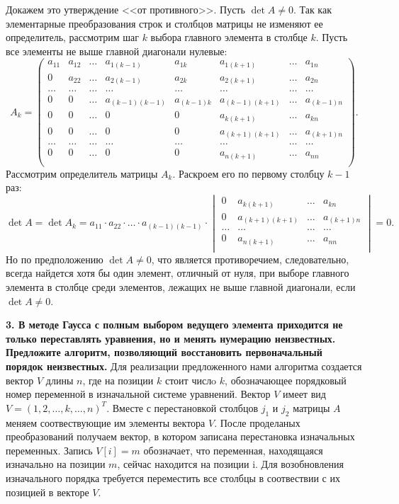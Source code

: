 \documentclass[12pt, a4paper]{article}
\begin{document}
Докажем это утверждение <<от противного>>.  Пусть $\det A \ne 0$. Так как элементарные преобразования строк и столбцов матрицы не изменяют ее определитель, рассмотрим шаг $k$ выбора главного элемента в столбце $k$. Пусть все элементы не выше главной диагонали нулевые:
\[ A_k = 
\begin{pmatrix}
	a_{11} & a_{12} & \ldots & a_{1(k-1)} & a_{1k} & a_{1(k+1)} & \ldots & a_{1n}\\
	0 & a_{22} & \ldots & a_{2(k-1)} & a_{2k} & a_{2(k+1)} & \ldots & a_{2n}\\
	\ldots & \ldots & \ldots & \ldots & \ldots & \ldots &   \ldots & \ldots \\
	0 & 0 & \ldots & a_{(k-1)(k-1)} & a_{(k-1)k} & a_{(k-1)(k+1)} & \ldots & a_{(k-1)n}\\
	0 & 0 & \ldots & 0 & 0 & a_{k(k+1)} & \ldots & a_{kn}\\
	0 & 0 & \ldots & 0 & 0 & a_{(k+1)(k+1)} & \ldots & a_{(k+1)n}\\
	\ldots & \ldots & \ldots & \ldots & \ldots & \ldots &   \ldots & \ldots \\
	0 & 0 & \ldots & 0 & 0 & a_{n(k+1)} & \ldots & a_{nn}\\
\end{pmatrix}.
\]
Рассмотрим определитель матрицы $A_k$. Раскроем его по первому столбцу $k-1$ раз:
$$\det A=\det A_k = a_{11} \cdot a_{22} \cdot \ldots \cdot a_{(k-1)(k-1)} \cdot 
\begin{vmatrix}
	0 & a_{k(k+1)} & \ldots & a_{kn}\\
	0 & a_{(k+1)(k+1)} & \ldots & a_{(k+1)n}\\
	\ldots &   \ldots & \ldots &\ldots\\
	0 & a_{n(k+1)} & \ldots & a_{nn}\\
\end{vmatrix} = 0.
$$
Но по предположению $\det A \ne 0$, что является противоречием, следовательно, всегда найдется хотя бы один элемент, отличный от нуля, при выборе главного элемента в столбце среди элементов, лежащих не выше главной диагонали, если $\det A \ne 0$.

\textbf{3. В методе Гаусса с полным выбором ведущего элемента приходится не только переставлять уравнения, но и менять нумерацию неизвестных. Предложите алгоритм, позволяющий восстановить первоначальный порядок неизвестных.  }
Для реализации предложенного нами алгоритма создается вектор $V$ длины $n$,  где на позиции $k$ стоит числo $k$, обозначающее порядковый  номер переменной в изначальной системе уравнений. Вектор $V$ имеет вид $V=(1,2,\dots ,k,\dots ,n)^T$.  Вместе с перестановкой столбцов $j_1$ и  $j_2$ матрицы $A$ меняем соотвествующие им элементы вектора $V$. После проделаных преобразований получаем вектор, в котором записана перестановка изначальных переменных. Запись $V[i]=m$ обозначает, что переменная, находящаяся изначально на позиции $m$, сейчас находится на позиции i. Для возобновления изначального порядка требуется переместить все столбцы в соотвествии с их позицией в векторе $V$.
\end{document}
